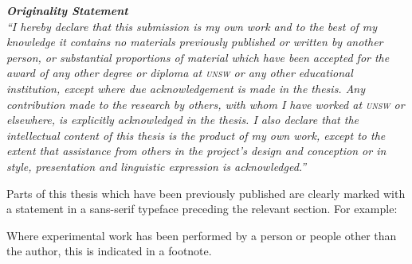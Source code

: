 \begin{center}
\begin{minipage}{0.6\textwidth}
\bigskip
\bigskip
\bigskip
\bigskip
\bigskip
\bigskip
  \textit{
    \textbf{Originality Statement}\\
    \smallskip
    ``I hereby declare that this submission is my own work and to the best of my knowledge it contains no materials previously published or written by another person, or substantial proportions of material which have been accepted for the award of any other degree or diploma at \textsc{unsw} or any other educational institution, except where due acknowledgement is made in the thesis. 
    Any contribution made to the research by others, with whom I have worked at \textsc{unsw} or elsewhere, is explicitly acknowledged in the thesis. 
    I also declare that the intellectual content of this thesis is the product of my own work, except to the extent that assistance from others in the project's design and conception or in style, presentation and linguistic expression is acknowledged.''
  }
\end{minipage}
\end{center}
\bigskip
\bigskip
\bigskip
\bigskip
\bigskip

Parts of this thesis which have been previously published are clearly marked with a statement in a sans-serif typeface preceding the relevant section. For example:

\smallskip
\bigskip


\smallskip
\bigskip

Where experimental work has been performed by a person or people other than the author, this is indicated in a footnote.
